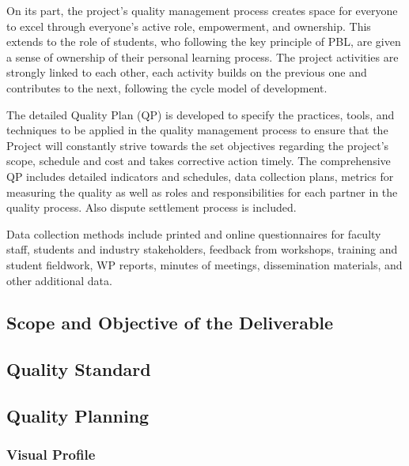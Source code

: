 \documentclass[
  11pt,
]{article}
\begin{document}
On its part, the project's quality management process creates space for
everyone to excel through everyone's active role, empowerment, and
ownership. This extends to the role of students, who following the key
principle of PBL, are given a sense of ownership of their personal
learning process. The project activities are strongly linked to each
other, each activity builds on the previous one and contributes to the
next, following the cycle model of development.

The detailed Quality Plan (QP) is developed to specify the practices,
tools, and techniques to be applied in the quality management process to
ensure that the Project will constantly strive towards the set
objectives regarding the project's scope, schedule and cost and takes
corrective action timely. The comprehensive QP includes detailed
indicators and schedules, data collection plans, metrics for measuring
the quality as well as roles and responsibilities for each partner in
the quality process. Also dispute settlement process is included.

Data collection methods include printed and online questionnaires for
faculty staff, students and industry stakeholders, feedback from
workshops, training and student fieldwork, WP reports, minutes of
meetings, dissemination materials, and other additional data.

\hypertarget{scope-and-objective-of-the-deliverable}{%
\subsection{Scope and Objective of the
Deliverable}\label{scope-and-objective-of-the-deliverable}}

\hypertarget{quality-standard}{%
\subsection{Quality Standard}\label{quality-standard}}

\hypertarget{quality-planning-1}{%
\subsection{Quality Planning}\label{quality-planning-1}}

\hypertarget{visual-profile}{%
\subsubsection{Visual Profile}\label{visual-profile}}
\end{document}
